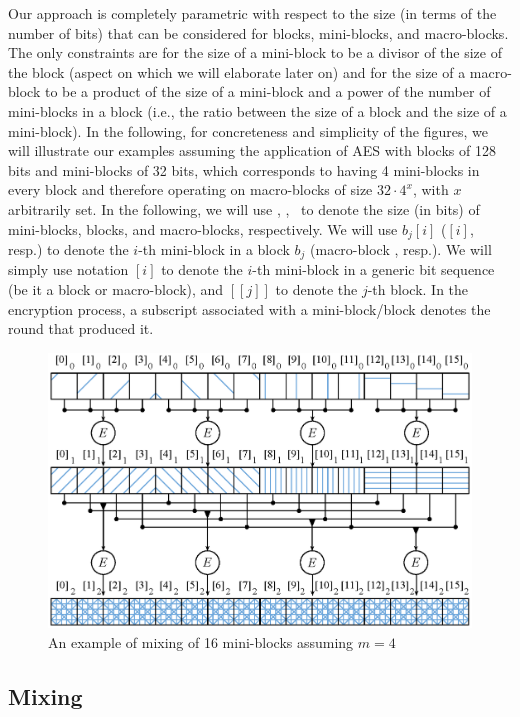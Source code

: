 Our approach is completely parametric with respect to the size (in terms of the number of bits) that can be considered for blocks, mini-blocks, and macro-blocks. The only constraints are for the size of a mini-block to be a divisor of the size of the block (aspect on which we will elaborate later on) and for the size of a macro-block to be a product of the size of a mini-block and a power of the number of mini-blocks in a block (i.e., the ratio between the size of a block and the size of a mini-block). In the following, for concreteness and simplicity of the figures, we will illustrate our examples assuming the application of AES with blocks of 128 bits and mini-blocks of 32 bits, which corresponds to having 4 mini-blocks in every block and therefore operating on macro-blocks of size $32 \cdot 4^x$, with $x$ arbitrarily set. In the following, we will use \msize, \bsize, \Msize\ to denote the size (in bits) of mini-blocks, blocks, and macro-blocks, respectively. We will use $b_j[i]$ ($[i]$, resp.) to denote the $i$-th mini-block in a block $b_j$ (macro-block , resp.). We will simply use notation $[i]$ to denote the $i$-th mini-block in a generic bit sequence (be it a block or macro-block), and $[[j]]$ to denote the $j$-th block. In the encryption process, a subscript associated with a mini-block/block denotes the round that produced it.

\begin{figure}[!t]
\centering
\includegraphics[width=0.9\columnwidth]{figures/fig01}
\caption{\label{ms:fig:mixing} An example of mixing of 16 mini-blocks assuming $m=4$}
\end{figure}

\subsection{Mixing}
\label{ms:sect:mixing}


